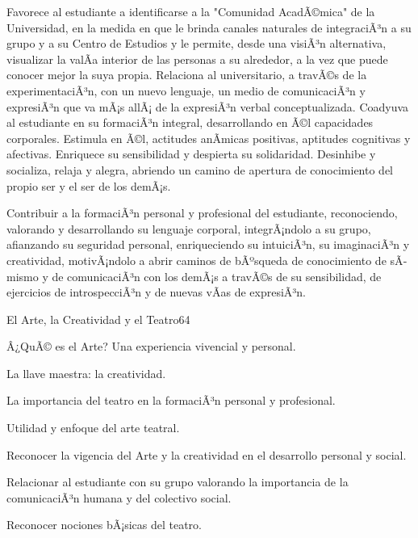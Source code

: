 \begin{syllabus}


\begin{justification}
Favorece al estudiante a identificarse a la "Comunidad AcadÃ©mica" de la Universidad, en la medida en que le brinda canales naturales de integraciÃ³n a su grupo y  a su Centro de Estudios y le permite,  desde una visiÃ³n alternativa, visualizar la valÃ­a interior de las personas a su alrededor, a la vez que puede conocer mejor la suya propia. 
Relaciona al universitario, a travÃ©s de la experimentaciÃ³n, con un nuevo lenguaje, un medio de comunicaciÃ³n y expresiÃ³n que va mÃ¡s allÃ¡ de la expresiÃ³n verbal conceptualizada.
Coadyuva al estudiante en su formaciÃ³n integral, desarrollando en Ã©l  capacidades corporales. Estimula en Ã©l, actitudes anÃ­micas positivas,  aptitudes cognitivas y afectivas. Enriquece su sensibilidad y despierta su solidaridad.    
Desinhibe y socializa, relaja y alegra,  abriendo un camino de apertura de conocimiento del propio ser y el ser de los demÃ¡s.

\end{justification}

\begin{goals}
\item Contribuir a la formaciÃ³n personal y profesional del estudiante, reconociendo, valorando y desarrollando su lenguaje corporal, integrÃ¡ndolo a su grupo, afianzando su seguridad personal, enriqueciendo su intuiciÃ³n, su imaginaciÃ³n y creatividad, motivÃ¡ndolo  a abrir caminos de bÃºsqueda  de conocimiento de sÃ­ mismo y de comunicaciÃ³n con los demÃ¡s a travÃ©s de su sensibilidad, de ejercicios de introspecciÃ³n y de nuevas vÃ­as de expresiÃ³n.   
\end{goals}

\begin{outcomes}
\end{outcomes}

\begin{unit}{El Arte, la Creatividad y el Teatro}{}{6}{4}
\begin{topics}
	\item Â¿QuÃ© es el Arte? Una experiencia vivencial y personal.
	\item La llave maestra: la creatividad.
	\item La importancia del teatro en la formaciÃ³n personal y profesional.
	\item Utilidad y enfoque del arte teatral.
\end{topics}
\begin{unitgoals}
	\item Reconocer la vigencia del Arte y la creatividad en el desarrollo personal y social.
	\item Relacionar al estudiante con su grupo valorando la importancia de la comunicaciÃ³n humana y del colectivo  social.
	\item Reconocer nociones  bÃ¡sicas del teatro. 
\end{unitgoals}
\end{unit}


\end{syllabus}
